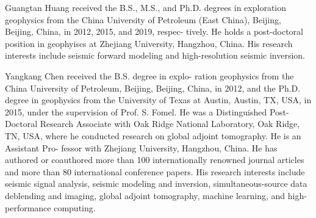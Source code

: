 \begin{IEEEbiography}{Guangtan Huang} received the B.S., M.S., and Ph.D. degrees in exploration geophysics from the China University of Petroleum (East China), Beijing, Beijing, China, in 2012, 2015, and 2019, respec- tively. He holds a post-doctoral position in geophyiscs at Zhejiang University, Hangzhou, China. His research interests include seismic forward modeling and high-resolution seismic inversion.
\end{IEEEbiography}



\begin{IEEEbiography}{Yangkang Chen} received the B.S. degree in explo- ration geophysics from the China University of Petroleum, Beijing, Beijing, China, in 2012, and the Ph.D. degree in geophysics from the University of Texas at Austin, Austin, TX, USA, in 2015, under the supervision of Prof. S. Fomel.
He was a Distinguished Post-Doctoral Research Associate with Oak Ridge National Laboratory, Oak Ridge, TN, USA, where he conducted research on global adjoint tomography. He is an Assistant Pro- fessor with Zhejiang University, Hangzhou, China. He has authored or coauthored more than 100 internationally renowned journal articles and more than 80 international conference papers. His research interests include seismic signal analysis, seismic modeling and inversion, simultaneous-source data deblending and imaging, global adjoint tomography, machine learning, and high-performance computing.
\end{IEEEbiography}

\EOD


